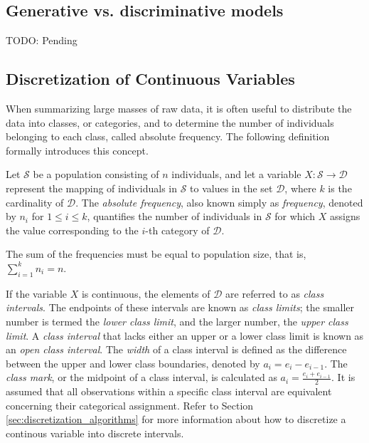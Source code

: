 \subsection{Generative vs. discriminative models}
\label{sec:generative_discriminative}

{\color{red} TODO: Pending}


\subsection{Discretization of Continuous Variables}
\label{subsec:discretization_continuous_variables}

When summarizing large masses of raw data, it is often useful to distribute the data into classes, or categories, and to determine the number of individuals belonging to each class, called absolute frequency. The following definition formally introduces this concept.

\begin{definition}
Let $\mathcal{S}$ be a population consisting of $n$ individuals, and let a variable $X: \mathcal{S} \rightarrow \mathcal{D}$ represent the mapping of individuals in $\mathcal{S}$ to values in the set $\mathcal{D}$, where $k$ is the cardinality of $\mathcal{D}$. The \emph{absolute frequency}, also known simply as \emph{frequency}, denoted by $n_i$ for $1 \leq i \leq k$, quantifies the number of individuals in $\mathcal{S}$ for which $X$ assigns the value corresponding to the $i$-th category of $\mathcal{D}$.
\end{definition}

The sum of the frequencies must be equal to population size, that is, $\sum_{i=1}^k n_i = n$.

If the variable $X$ is continuous, the elements of $\mathcal{D}$ are referred to as \emph{class intervals}. The endpoints of these intervals are known as \emph{class limits}; the smaller number is termed the \emph{lower class limit}, and the larger number, the \emph{upper class limit}. A \emph{class interval} that lacks either an upper or a lower class limit is known as an \emph{open class interval}. The \emph{width} of a class interval is defined as the difference between the upper and lower class boundaries, denoted by $a_i = e_i - e_{i-1}$. The \emph{class mark}, or the midpoint of a class interval, is calculated as $a_i = \frac{e_i + e_{i-1}}{2}$. It is assumed that all observations within a specific class interval are equivalent concerning their categorical assignment. Refer to Section \ref{sec:discretization_algorithms} for more information about how to discretize a continous variable into discrete intervals.


